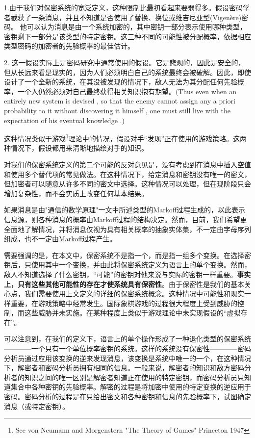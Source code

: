 \documentclass[]{article}
\begin{document}
1.由于我们对保密系统的宽泛定义，这种限制比最初看起来要弱得多。假设密码学者截获了一条消息，并且不知道是否使用了替换、换位或维吉尼亚型(Vigen\`{e}re)密码。 他可以认为消息是由一个系统加密的，其中密钥一部分表示使用哪种类型，密钥剩下一部分是该类型的特定密钥。这三种不同的可能性被分配概率，依据相应类型密码的加密者的先验概率的最佳估计。


2. 这一假设实际上是密码研究中通常使用的假设。它是悲观的，因此是安全的，但从长远来看是现实的，因为人们必须明白自己的系统最终会被破解。因此，即使设计了一个全新的系统，在其没被发现的情况下，敌人无法为其分配任何先验概率，一个人仍然必须对自己最终获得相关知识抱有期望。(Thus even when an entirely new system is devised , so that the enemy cannot assign any a priori probability to it without discovering it himself , one must still live with the expectation of his eventual knowledge .)

这种情况类似于游戏\footnote{ See von Neumann and Morgenstern	"The Theory of Games" Princeton 1947}理论中的情况，假设对手“发现”正在使用的游戏策略。这两种情况下，假设都用来清晰地描绘对手的知识。


对我们的保密系统定义的第二个可能的反对意见是，没有考虑到在消息中插入空值和使用多个替代项的常见做法。在这种情况下，给定消息和密钥没有唯一的密文，但加密者可以随意从许多不同的密文中选择。这种情况可以处理，但在现阶段只会增加复杂性，而不会实质上改变任何基本结果。

如果消息是由"通信的数学原理"一文中所述类型的Markoff过程生成的，以此表示信息源，则各种消息的概率由Markoff过程的结构决定。然而，目前，我们希望更全面地了解情况，并将消息仅视为具有相关概率的抽象实体集，不一定由字母序列组成，也不一定由Markoff过程产生。

需要强调的是，在本文中，保密系统不是指一个，而是指一组多个变换。在选择密钥后，只使用其中一个变换，并由此将保密系统定义为语言上的单个变换。然而，敌人不知道选择了什么密钥，“可能”的密钥对他来说与实际的密钥一样重要。\textbf{事实上，只有这些其他可能性的存在才使系统具有保密性}。由于保密性是我们的基本关心点，我们需要使用上文定义的详细的保密系统概念。这种情况中可能性和现实一样重要，在游戏策略中经常发生。国际象棋游戏的过程很大程度上受到威胁的控制，而这些威胁并未实施。在某种程度上类似于游戏理论中未实现假设的“虚拟存在”。

可以注意到，在我们的定义下，语言上的单个操作形成了一种退化类型的保密系统————一个只有一个单位概率密钥的系统。这样的系统没有保密性————密码分析员通过应用该变换的逆来发现消息，该变换是系统中唯一的一个，在这种情况下，解密者和密码分析员拥有相同的信息。一般来说，解密者的知识和敌方密码分析者的知识之间的唯一区别是解密者知道正在使用的特定密钥，而密码分析员只知道集合中各种密钥的先验概率。解密的过程是将加密中使用的特定变换的逆应用于密码。密码分析的过程是在只给出密文和各种密钥和信息的先验概率下，试图确定消息（或特定密钥）。
\end{document}
